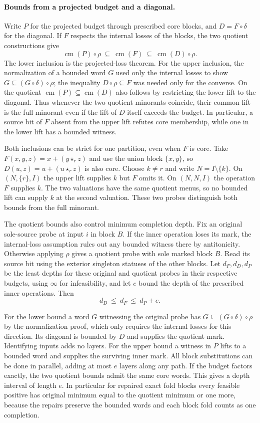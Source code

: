 \paragraph{Bounds from a projected budget and a diagonal.}
Write $P$ for the projected budget through prescribed
core blocks, and $D=F\circ\delta$ for the diagonal.
If $F$ respects the internal losses of the blocks,
the two quotient constructions give
\[
 \operatorname{cm}(P)\circ\rho
 \ \subseteq\ \operatorname{cm}(F)\
 \subseteq\ \operatorname{cm}(D)\circ\rho .
\]
The lower inclusion is the projected-loss theorem.
For the upper inclusion, the normalization of a
bounded word $G$ used only the internal losses to show
$G\subseteq (G\circ\delta)\circ\rho$; the inequality
$D\circ\rho\subseteq F$ was needed only for the converse.
On the quotient $\operatorname{cm}(P)\subseteq\operatorname{cm}(D)$
also follows by restricting the lower lift to the
diagonal. Thus whenever the two quotient minorants
coincide, their common lift is the full minorant even
if the lift of $D$ itself exceeds the budget. In
particular, a source bit of $F$ absent from the upper
lift refutes core membership, while one in the lower
lift has a bounded witness.

Both inclusions can be strict for one partition, even
when $F$ is core. Take
$F(x,y,z)=x+(y\star_r z)$ and use the union block
$\{x,y\}$, so $D(u,z)=u+(u\star_r z)$ is also core.
Choose $k\ne r$ and write $N=I\setminus\{k\}$.
On $(N,\{r\},I)$ the upper lift supplies $k$ but $F$
omits it. On $(N,N,I)$ the operation $F$ supplies $k$.
The two valuations have the same quotient menus,
so no bounded lift can supply $k$ at the second
valuation. These two probes distinguish both bounds
from the full minorant.

The quotient bounds also control minimum completion
depth. Fix an original sole-source probe at input $i$
in block $B$. If the inner operation loses its mark,
the internal-loss assumption rules out any bounded
witness there by antitonicity. Otherwise applying
$\rho$ gives a quotient probe with sole marked block
$B$. Read its source bit using the exterior singleton
statuses of the other blocks. Let $d_F,d_D,d_P$ be
the least depths for these original and quotient
probes in their respective budgets, using $\infty$
for infeasibility, and let $e$ bound the depth of
the prescribed inner operations. Then
\[
                  d_D\ \le\ d_F\ \le\ d_P+e .
\]

For the lower bound a word $G$ witnessing the original
probe has $G\subseteq (G\circ\delta)\circ\rho$ by the
normalization proof, which only requires the internal
losses for this direction. Its diagonal is bounded by
$D$ and supplies the quotient mark. Identifying inputs
adds no layers. For the upper bound a witness in $P$
lifts to a bounded word and supplies the surviving
inner mark. All block substitutions can be done in
parallel, adding at most $e$ layers along any path.
If the budget factors exactly, the two quotient
bounds admit the same core words. This gives a
depth interval of
length $e$. In particular for repaired exact fold
blocks every feasible positive has original minimum
equal to the quotient minimum or one more, because
the repairs preserve the bounded words and each
block fold counts as one completion.

